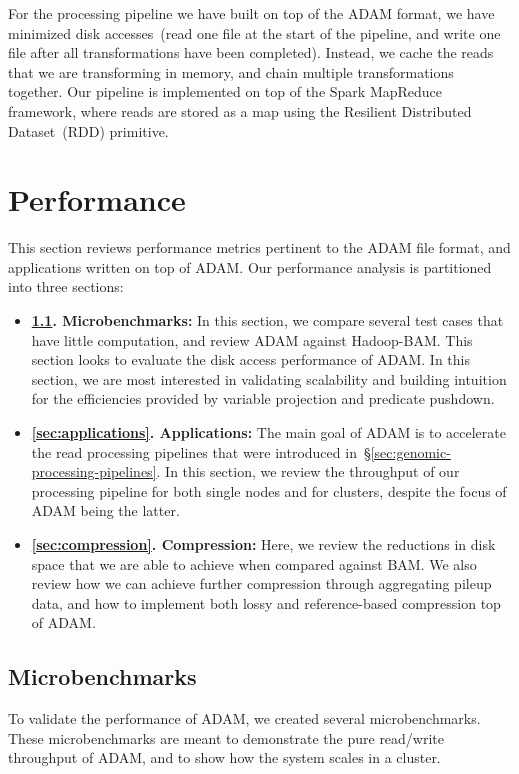 \documentclass[10pt,twocolumn]{article}
\theoremstyle{plain}
\begin{document}
For the processing pipeline we have built on top of the ADAM format, we have minimized disk accesses~(read one file at the
start of the pipeline, and write one file after all transformations have been completed). Instead, we cache the reads that we are
transforming in memory, and chain multiple transformations together. Our pipeline is implemented on top of the Spark MapReduce
framework, where reads are stored as a map using the Resilient Distributed Dataset~(RDD) primitive.

\section{Performance}
\label{sec:performance}

This section reviews performance metrics pertinent to the ADAM file format, and applications written on top of ADAM. Our performance
analysis is partitioned into three sections:

\begin{itemize}
\item {\bf \ref{sec:microbenchmarks}. Microbenchmarks:} In this section, we compare several test cases that have little computation, and
review ADAM against Hadoop-BAM. This section looks to evaluate the disk access performance of ADAM. In this section, we are most
interested in validating scalability and building intuition for the efficiencies provided by variable projection and predicate pushdown.
\item {\bf \ref{sec:applications}. Applications:} The main goal of ADAM is to accelerate the read processing pipelines that were introduced
in~\S\ref{sec:genomic-processing-pipelines}. In this section, we review the throughput of our processing pipeline for both single nodes and for clusters, despite the focus of ADAM being the latter.
\item {\bf \ref{sec:compression}. Compression:} Here, we review the reductions in disk space that we are able to achieve when compared
against BAM. We also review how we can achieve further compression through aggregating pileup data, and how to implement both
lossy and reference-based compression top of ADAM.
\end{itemize}

\subsection{Microbenchmarks}
\label{sec:microbenchmarks}

To validate the performance of ADAM, we created several microbenchmarks. These microbenchmarks are meant to demonstrate
the pure read/write throughput of ADAM, and to show how the system scales in a cluster. 
\end{document}
